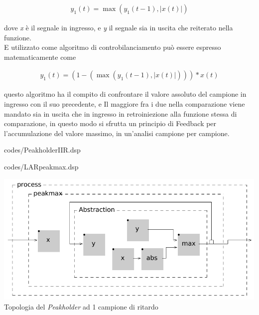 \begin{align*} 
    y_{1}(t) = \max\left( y_{1}(t\!-\!1), \left\lvert{x(t)}\right\rvert \right) 
\end{align*}

dove \textit{x} è il segnale in ingresso, e \textit{y} il segnale sia in uscita che reiterato nella funzione. \\
E utilizzato come algoritmo di controbilanciamento può essere espresso matematicamente come

\begin{align*} 
    y_{1}(t) = (1-(\max\left( y_{1}(t\!-\!1), \left\lvert{x(t)}\right\rvert \right))) * x(t)
\end{align*}

questo algoritmo ha il compito di confrontare il valore assoluto del campione in ingresso con il suo precedente,
e Il maggiore fra i due nella comparazione viene mandato sia in uscita che in ingresso 
in retroiniezione alla funzione stessa di comparazione, 
in questo modo si sfrutta un principio di Feedback per l'accumulazione
del valore massimo, in un'analisi campione per campione.

\vspace{0.5cm} 

{codes/PeakholderIIR.dsp}

\vspace{0.5cm} 

{codes/LARpeakmax.dsp}

\begin{center}
    \includegraphics[width=14cm]{figures/PeakholderIIR.pdf} \\
    {Topologia del \textit{Peakholder} ad 1 campione di ritardo} \\ 
    \end{center}

